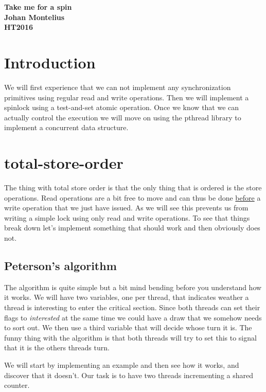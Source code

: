 \documentclass[a4paper,11pt]{article}
\begin{document}
\begin{center} \vspace{20pt} \textbf{\large Take me for a spin}\\
\vspace{10pt} \textbf{Johan Montelius}\\ \vspace{10pt} \textbf{HT2016}
\end{center}


\section{Introduction}

We will first experience that we can not implement any synchronization
primitives using regular read and write operations. Then we will
implement a spinlock using a test-and-set atomic operation. Once we
know that we can actually control the execution we will move on using
the pthread library to implement a concurrent data structure.


\section{total-store-order}

The thing with total store order is that the only thing that is
ordered is the store operations. Read operations are a bit free to move
and can thus be done \underline{before} a write operation that we just
have issued. As we will see this prevents us from writing a simple
lock using only read and write operations. To see that things break
down let's implement something that should work and then obviously
does not.

\subsection{Peterson's algorithm}

The algorithm is quite simple but a bit mind bending before you
understand how it works. We will have two variables, one per thread,
that indicates weather a thread is interesting to enter the critical
section. Since both threads can set their flags to {\em interested} at
the same time we could have a draw that we somehow needs to sort
out. We then use a third variable that will decide whose turn it
is. The funny thing with the algorithm is that both threads will try
to set this to signal that it is the others threads turn.

We will start by implementing an example and then see how it works,
and discover that it doesn't. Our task is to have two threads
incrementing a shared counter.
\end{document}
